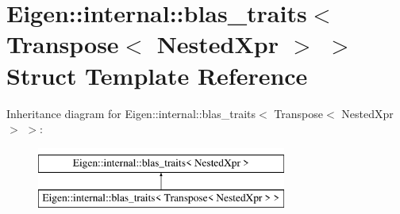 \hypertarget{struct_eigen_1_1internal_1_1blas__traits_3_01_transpose_3_01_nested_xpr_01_4_01_4}{}\section{Eigen\+::internal\+::blas\+\_\+traits$<$ Transpose$<$ Nested\+Xpr $>$ $>$ Struct Template Reference}
\label{struct_eigen_1_1internal_1_1blas__traits_3_01_transpose_3_01_nested_xpr_01_4_01_4}
Inheritance diagram for Eigen\+::internal\+::blas\+\_\+traits$<$ Transpose$<$ Nested\+Xpr $>$ $>$\+:\begin{figure}[H]
\begin{center}
\leavevmode
\includegraphics[height=2.000000cm]{struct_eigen_1_1internal_1_1blas__traits_3_01_transpose_3_01_nested_xpr_01_4_01_4}
\end{center}
\end{figure}
